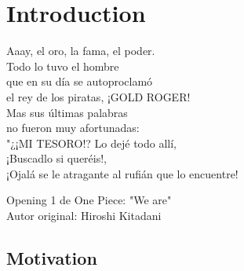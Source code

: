 % 
% 
% 
% 
% 
% 
% 

\chapter{Introduction}
\label{cha:introduction}

\begin{FraseCelebre}
  \begin{Frase}
    Aaay, el oro, la fama, el poder.  \\
    Todo lo tuvo el hombre \\
    que en su día se autoproclamó  \\
    el rey de los piratas, ¡GOLD ROGER!  \\
    Mas sus últimas palabras \\
    no fueron muy afortunadas: \\
    "¿¡MI TESORO!? Lo dejé todo allí, \\
    ¡Buscadlo si queréis!,  \\
    ¡Ojalá se le atragante al rufián que lo encuentre!
  \end{Frase}
  \begin{Fuente}
    Opening 1 de One Piece: "We are" \\
    Autor original: Hiroshi Kitadani
  \end{Fuente}
\end{FraseCelebre}

\section{Motivation}
\label{sec:1_motivation}

